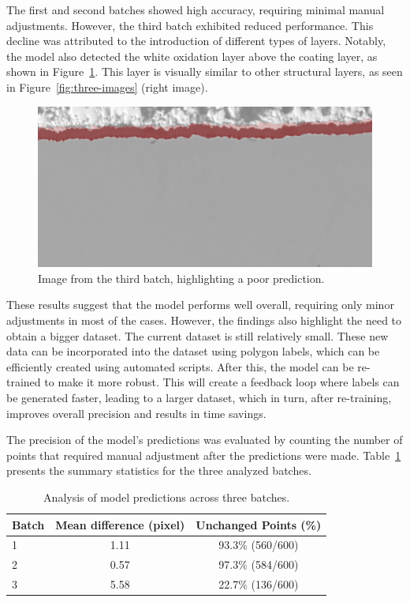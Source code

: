 The first and second batches showed high accuracy, requiring minimal manual adjustments. However, the third batch exhibited reduced performance. This decline was attributed to the introduction of different types of layers. Notably, the model also detected the white oxidation layer above the coating layer, as shown in Figure~\ref{fig:ox}. This layer is visually similar to other structural layers, as seen in Figure~\ref{fig:three-images} (right image).

\begin{figure}[H]
    \centering
    \includegraphics[width=0.5\linewidth]{PICTURES/aa.png}
    \caption{Image from the third batch, highlighting a poor prediction.}
    \label{fig:ox}
\end{figure}

These results suggest that the model performs well overall, requiring only minor adjustments in most of the cases. However, the findings also highlight the need to obtain a bigger dataset. The current dataset is still relatively small. These new data can be incorporated into the dataset using polygon labels, which can be efficiently created using automated scripts. After this, the model can be re-trained to make it more robust. This will create a feedback loop where labels can be generated faster, leading to a larger dataset, which in turn, after re-training, improves overall precision and results in time savings.

The precision of the model's predictions was evaluated by counting the number of points that required manual adjustment after the predictions were made. Table~\ref{tab:results} presents the summary statistics for the three analyzed batches.

\begin{table}[H]
    \centering
    \begin{tabular}{lcc}
        \toprule
        \textbf{Batch} & \textbf{Mean difference (pixel)}  & \textbf{Unchanged Points (\%)} \\
        \midrule
        1 & 1.11  & 93.3\% (560/600) \\
        2 & 0.57  & 97.3\% (584/600) \\
        3 & 5.58  & 22.7\% (136/600) \\
        \bottomrule
    \end{tabular}
    \caption{Analysis of model predictions across three batches.}
    \label{tab:results}

\end{table}

